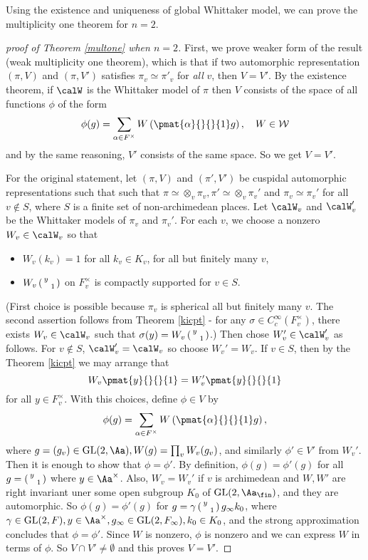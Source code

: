Using the existence and uniqueness of global Whittaker model, we can prove the multiplicity one theorem for $n = 2$. 
\begin{proof}[proof of Theorem \ref{multone} when $n=2$]
First, we prove weaker form of the result (weak multiplicity one theorem), which is that if two automorphic representation $(\pi, V)$ and $(\pi, V')$ satisfies $\pi_{v}\simeq \pi'_{v}$ for \emph{all} $v$, then $V = V'$. 
By the existence theorem, if $\calW$ is the Whittaker model of $\pi$ then $V$ consists of the space of all functions $\phi$ of the form 
$$
\phi(g) = \sum_{\alpha\in F^{\times}} W\left( \pmat{\alpha}{}{}{1}g \right), \quad W\in \cal W
$$
and by the same reasoning, $V'$ consists of the same space. So we get $V = V'$. 

For the original statement, let $(\pi, V)$ and $(\pi', V')$ be cuspidal automorphic representations such that such that $\pi \simeq \otimes_{v}\pi_{v}, \pi'\simeq \otimes_{v}\pi_{v}'$ and $\pi_{v}\simeq \pi_{v}'$ for all $v\not\in S$, where $S$ is a finite set of non-archimedean places. 
Let $\calW_{v}$ and $\calW_{v}'$ be the Whittaker models of $\pi_{v}$ and $\pi_{v}'$. 
For each $v$, we choose a nonzero $W_{v}\in \calW_{v}$ so that 
\begin{itemize}
\item $W_{v}(k_{v}) = 1$ for all $k_{v}\in K_{v}$, for all but finitely many $v$, 
\item $W_{v}\left(\begin{smallmatrix} y &  \\  & 1 \end{smallmatrix}\right)$ on $F_{v}^{\times}$ is compactly supported  for $v\in S$. 
\end{itemize}
(First choice is possible because $\pi_v$ is spherical all but finitely many $v$. The second assertion follows from Theorem \ref{kicpt} - for any $\sigma \in C_{c}^{\infty}(F_{v}^{\times})$, there exists $W_v \in \calW_v$ such that $\sigma(y) = W_{v} \left(\begin{smallmatrix} y &  \\  & 1 \end{smallmatrix}\right)$.)  
Then chose $W_{v}'\in \calW_{v}'$ as follows. 
For $v\not\in S$, $\calW_{v}' = \calW_{v}$ so choose $W_{v}' = W_{v}$. 
If $v\in S$, then by the Theorem \ref{kicpt} we may arrange that 
$$
W_{v}\pmat{y}{}{}{1} = W_{v}'\pmat{y}{}{}{1}
$$
for all $y\in F_{v}^{\times}$. 
With this choices, define $\phi\in V$ by 
$$
\phi(g) = \sum_{\alpha\in F^{\times}} W\left(\pmat{\alpha}{}{}{1}g \right), 
$$
where $g = (g_{v})\in \GL(2, \Aa), W(g) = \prod_{v} W_{v}(g_{v})$, and similarly $\phi'\in V'$ from $W_{v}'$. 
Then it is enough to show that $\phi = \phi'$. 
By definition, $\phi(g) = \phi'(g)$ for all $g = \left(\begin{smallmatrix} y &  \\  & 1 \end{smallmatrix}\right)$ where $y\in \Aa^{\times}$. 
Also, $W_{v}= W_{v}'$ if $v$ is archimedean and $W, W'$ are right invariant uner some open subgroup $K_{0}$ of $\GL(2, \Aa_{\fin})$, and they are automorphic. So $\phi(g) = \phi'(g)$ for $g = \gamma\left(\begin{smallmatrix} y &  \\  & 1 \end{smallmatrix}\right) g_{\infty}k_{0}$, where $\gamma\in \GL(2, F), y\in \Aa^{\times}, g_{\infty}\in \GL(2, F_{\infty}), k_{0}\in K_{0}$, and the strong approximation concludes that $\phi = \phi'$. 
Since $W$ is nonzero, $\phi$ is nonzero and we can express $W$ in terms of $\phi$. So $V\cap V'\neq\emptyset$ and this proves $V = V'$.  
\end{proof}


